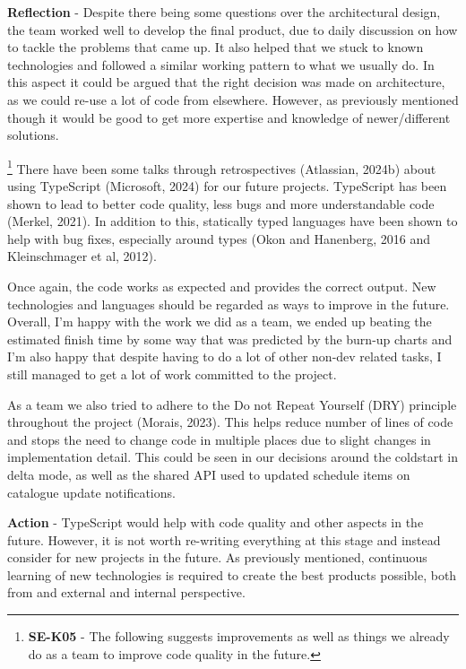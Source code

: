   \vspace{0.2cm}
  \textbf{Reflection} - Despite there being some questions over the architectural design, the team worked well to develop the final product, due to daily 
  discussion on how to tackle the problems that came up. It also helped that we stuck to known technologies and followed a similar working pattern to what 
  we usually do. In this aspect it could be argued that the right decision was made on architecture, as we could re-use a lot of code from elsewhere.
  However, as previously mentioned though it would be good to get more expertise and knowledge of newer/different solutions.

  \footnote{\textbf{SE-K05} - The following suggests improvements as well as things we already do as a team to improve code quality in the future.}
  There have been some talks through retrospectives (Atlassian, 2024b) about using TypeScript (Microsoft, 2024) for our future projects. TypeScript has been 
  shown to lead to better code quality, less bugs and more understandable code (Merkel, 2021). In addition to this, statically typed languages have been shown
  to help with bug fixes, especially around types (Okon and Hanenberg, 2016 and Kleinschmager et al, 2012).

  Once again, the code works as expected and provides the correct output. New technologies and languages should be regarded as ways to improve in the future.
  Overall, I'm happy with the work we did as a team, we ended up beating the estimated finish time by some way that was predicted by the burn-up charts and 
  I'm also happy that despite having to do a lot of other non-dev related tasks, I still managed to get a lot of work committed to the project.

  As a team we also tried to adhere to the Do not Repeat Yourself (DRY) principle throughout the project (Morais, 2023). This helps reduce number of lines of 
  code and stops the need to change code in multiple places due to slight changes in implementation detail. This could be seen in our decisions around the 
  coldstart in delta mode, as well as the shared API used to updated schedule items on catalogue update notifications.

  \vspace{0.2cm}
  \textbf{Action} - TypeScript would help with code quality and other aspects in the future. However, it is not worth re-writing everything at this
  stage and instead consider for new projects in the future. As previously mentioned, continuous learning of new technologies is required to create the 
  best products possible, both from and external and internal perspective. 
  
